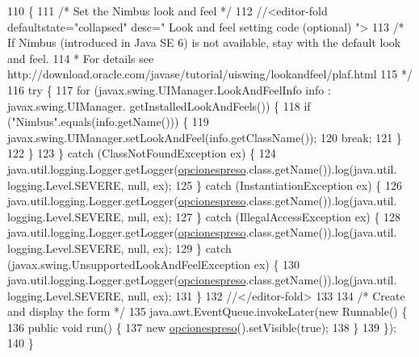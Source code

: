 \begin{DoxyCode}
110                                            \{
111         \textcolor{comment}{/* Set the Nimbus look and feel */}
112         \textcolor{comment}{//<editor-fold defaultstate="collapsed" desc=" Look and feel setting code (optional) ">}
113         \textcolor{comment}{/* If Nimbus (introduced in Java SE 6) is not available, stay with the default look and feel.}
114 \textcolor{comment}{         * For details see http://download.oracle.com/javase/tutorial/uiswing/lookandfeel/plaf.html }
115 \textcolor{comment}{         */}
116         \textcolor{keywordflow}{try} \{
117             \textcolor{keywordflow}{for} (javax.swing.UIManager.LookAndFeelInfo info : javax.swing.UIManager.
      getInstalledLookAndFeels()) \{
118                 \textcolor{keywordflow}{if} (\textcolor{stringliteral}{"Nimbus"}.equals(info.getName())) \{
119                     javax.swing.UIManager.setLookAndFeel(info.getClassName());
120                     \textcolor{keywordflow}{break};
121                 \}
122             \}
123         \} \textcolor{keywordflow}{catch} (ClassNotFoundException ex) \{
124             java.util.logging.Logger.getLogger(\mbox{\hyperlink{classsoftware_1_1opcionespreso_a7a3faf552876ca7ad20b768f262bee92}{opcionespreso}}.class.getName()).log(java.util.
      logging.Level.SEVERE, null, ex);
125         \} \textcolor{keywordflow}{catch} (InstantiationException ex) \{
126             java.util.logging.Logger.getLogger(\mbox{\hyperlink{classsoftware_1_1opcionespreso_a7a3faf552876ca7ad20b768f262bee92}{opcionespreso}}.class.getName()).log(java.util.
      logging.Level.SEVERE, null, ex);
127         \} \textcolor{keywordflow}{catch} (IllegalAccessException ex) \{
128             java.util.logging.Logger.getLogger(\mbox{\hyperlink{classsoftware_1_1opcionespreso_a7a3faf552876ca7ad20b768f262bee92}{opcionespreso}}.class.getName()).log(java.util.
      logging.Level.SEVERE, null, ex);
129         \} \textcolor{keywordflow}{catch} (javax.swing.UnsupportedLookAndFeelException ex) \{
130             java.util.logging.Logger.getLogger(\mbox{\hyperlink{classsoftware_1_1opcionespreso_a7a3faf552876ca7ad20b768f262bee92}{opcionespreso}}.class.getName()).log(java.util.
      logging.Level.SEVERE, null, ex);
131         \}
132         \textcolor{comment}{//</editor-fold>}
133 
134         \textcolor{comment}{/* Create and display the form */}
135         java.awt.EventQueue.invokeLater(\textcolor{keyword}{new} Runnable() \{
136             \textcolor{keyword}{public} \textcolor{keywordtype}{void} run() \{
137                 \textcolor{keyword}{new} \mbox{\hyperlink{classsoftware_1_1opcionespreso_a7a3faf552876ca7ad20b768f262bee92}{opcionespreso}}().setVisible(\textcolor{keyword}{true});
138             \}
139         \});
140     \}
\end{DoxyCode}


